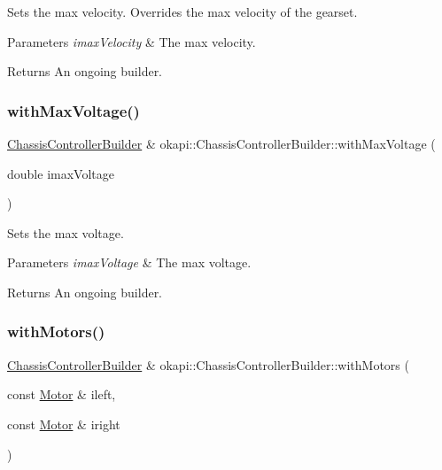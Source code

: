 Sets the max velocity. Overrides the max velocity of the gearset.


\begin{DoxyParams}{Parameters}
{\em imax\+Velocity} & The max velocity. \\
\hline
\end{DoxyParams}
\begin{DoxyReturn}{Returns}
An ongoing builder. 
\end{DoxyReturn}
\mbox{\label{classokapi_1_1ChassisControllerBuilder_a7bf0a781b124ae39c8fc46786d18243a}} 
\subsubsection{\texorpdfstring{withMaxVoltage()}{withMaxVoltage()}}
{\footnotesize\ttfamily \mbox{\hyperlink{classokapi_1_1ChassisControllerBuilder}{Chassis\+Controller\+Builder}} \& okapi\+::\+Chassis\+Controller\+Builder\+::with\+Max\+Voltage (\begin{DoxyParamCaption}\item[{double}]{imax\+Voltage }\end{DoxyParamCaption})}

Sets the max voltage.


\begin{DoxyParams}{Parameters}
{\em imax\+Voltage} & The max voltage. \\
\hline
\end{DoxyParams}
\begin{DoxyReturn}{Returns}
An ongoing builder. 
\end{DoxyReturn}
\mbox{\label{classokapi_1_1ChassisControllerBuilder_a1ceb7c4b4f0ccfd37a92d8ffd64fa64e}} 
\subsubsection{\texorpdfstring{withMotors()}{withMotors()}\hspace{0.1cm}{\footnotesize\ttfamily [1/6]}}
{\footnotesize\ttfamily \mbox{\hyperlink{classokapi_1_1ChassisControllerBuilder}{Chassis\+Controller\+Builder}} \& okapi\+::\+Chassis\+Controller\+Builder\+::with\+Motors (\begin{DoxyParamCaption}\item[{const \mbox{\hyperlink{classokapi_1_1Motor}{Motor}} \&}]{ileft,  }\item[{const \mbox{\hyperlink{classokapi_1_1Motor}{Motor}} \&}]{iright }\end{DoxyParamCaption})}

